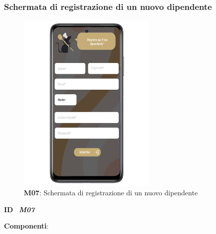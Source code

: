         \subsubsection{Schermata di registrazione di un nuovo dipendente}
        \begin{figure}[H]
            \centering
            \includegraphics[width=0.60\textwidth]{assets/Mockup/Mockup_SaveWaiter.png}
            \caption{\textbf{M07}: Schermata di registrazione di un nuovo dipendente}
            \label{fig:Mockup_SaveWorker}
        \end{figure}
        \begin{flushleft}
            \textbf{ID} \ \Large{\textit{\textbf{M07}}}
        \end{flushleft}
        \textbf{Componenti}:\\
